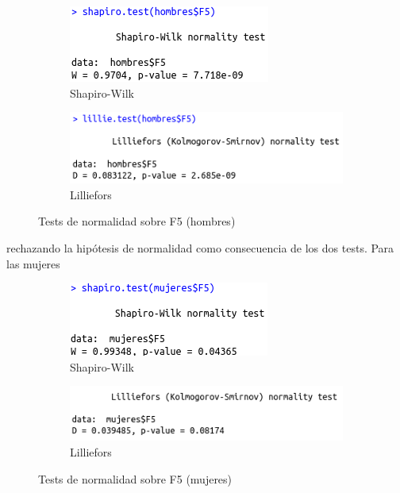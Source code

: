 \begin{figure}[H]
	\centering
	\begin{subfigure}{.5\textwidth}
		\centering
		\includegraphics[width=.6\linewidth]{swh-F5.png}
		\caption{Shapiro-Wilk}
		\label{fig:swh-F5}
	\end{subfigure}%
	\begin{subfigure}{.5\textwidth}
		\centering
		\includegraphics[width=.6\linewidth]{lh-F5.png}
		\caption{Lilliefors}
		\label{fig:lh-F5}
	\end{subfigure}
	\caption{Tests de normalidad sobre F5 (hombres)}
	\label{fig:normhF5}
\end{figure}

rechazando la hipótesis de normalidad como consecuencia de los dos tests. Para las mujeres

\begin{figure}[H]
	\centering
	\begin{subfigure}{.5\textwidth}
		\centering
		\includegraphics[width=.6\linewidth]{swm-F5.png}
		\caption{Shapiro-Wilk}
		\label{fig:swm-F5}
	\end{subfigure}%
	\begin{subfigure}{.5\textwidth}
		\centering
		\includegraphics[width=.6\linewidth]{lm-F5.png}
		\caption{Lilliefors}
		\label{fig:lm-F5}
	\end{subfigure}
	\caption{Tests de normalidad sobre F5 (mujeres)}
	\label{fig:normmF5}
\end{figure}

